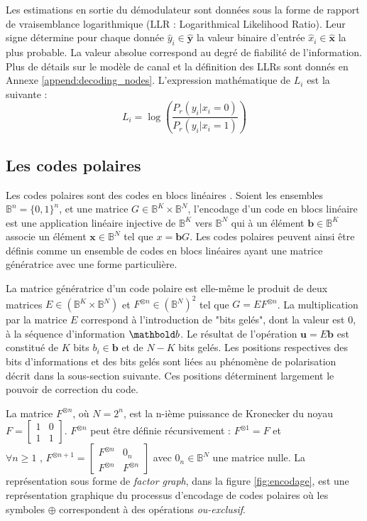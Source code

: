 Les estimations en sortie du démodulateur sont données sous la forme de rapport de vraisemblance logarithmique (LLR : Logarithmical Likelihood Ratio). Leur signe détermine pour chaque donnée $\hat{y}_i \in \mathbold{\hat{y}}$ la valeur binaire d'entrée $\hat{x}_i \in \mathbold{\hat{x}}$ la plus probable. La valeur absolue correspond au degré de fiabilité de l'information. Plus de détails sur le modèle de canal et la définition des LLRs sont donnés en Annexe \ref{append:decoding_nodes}. L'expression mathématique de $L_i$ est la suivante : 
\begin{equation*}
  L_i = \log\left(\dfrac{P_r(y_i | x_i = 0)}{P_r(y_i | x_i = 1)}\right)
\end{equation*}
\subsection{Les codes polaires}
Les codes polaires \cite{arikan_channel_2009} sont des codes en blocs linéaires \cite{morelos-zaragoza_art_2006}. Soient les ensembles $\mathbb{B}^n = \{0,1\}^n$, et une matrice $G \in \mathbb{B}^K \times \mathbb{B}^N$, l'encodage d'un code en blocs linéaire est une application linéaire injective de $\mathbb{B}^K$ vers $\mathbb{B}^N$ qui à un élément $\mathbold{b} \in \mathbb{B}^K$ associe un élément $\mathbold{x} \in \mathbb{B}^N$ tel que $x=\mathbold{b}G$. Les codes polaires peuvent ainsi être définis comme un ensemble de codes en blocs linéaires ayant une matrice génératrice avec une forme particulière.

La matrice génératrice d'un code polaire est elle-même le produit de deux matrices $E \in (\mathbb{B}^K \times \mathbb{B}^N)$ et $F^{\otimes n}\in (\mathbb{B}^N)^2$ tel que $G=EF^{\otimes n}$. La multiplication par la matrice $E$ correspond à l'introduction de "bits gelés", dont la valeur est $0$, à la séquence d'information $\mb{b}$. Le résultat de l'opération $\mathbold{u} = E\mathbold{b}$ est constitué de $K$ bits $b_i \in \mathbold{b}$ et de $N-K$ bits gelés. Les positions respectives des bits d'informations et des bits gelés sont liées au phénomène de polarisation décrit dans la sous-section suivante. Ces positions déterminent largement le pouvoir de correction du code.

La matrice $F^{\otimes n}$, où $N=2^n$, est la n-ième puissance de Kronecker du noyau $F=\left[\begin{smallmatrix} 1 & 0 \\ 1 & 1\end{smallmatrix}\right]$. $F^{\otimes n}$ peut être définie récursivement : $F^{\otimes 1} = F$ et $\forall {n \geq 1}\text{ , }{F^{\otimes n + 1}=\left[\begin{smallmatrix} F^{\otimes n} & 0_n \\ F^{\otimes n} & F^{\otimes n}\end{smallmatrix}\right]}$ avec $0_n \in \mathbb{B}^N$ une matrice nulle. La représentation sous forme de \textit{factor graph}, dans la figure \ref{fig:encodage}, est une représentation graphique du processus d'encodage de codes polaires où les symboles $\oplus$ correspondent à des opérations \textit{ou-exclusif}. 

